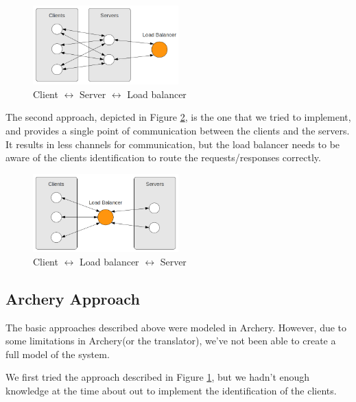 \documentclass[a4paper]{article}
\newcommand{\ar}{Archery\xspace}
\begin{document}
\begin{figure}[htb]
	\begin{center}
		\includegraphics[width=0.5\textwidth]{images/c_s_lb.png}
	\end{center}
	\caption{Client $\leftrightarrow$ Server $\leftrightarrow$ Load balancer }
	\label{fig:cslb}
\end{figure}

The second approach, depicted in Figure \ref{fig:clbs}, is the one that we
tried to implement, and provides a single point of communication between the
clients and the servers. It results in less channels for communication, but the
load balancer needs to be aware of the clients identification to route the
requests/responses correctly.

\begin{figure}[htb]
	\begin{center}
		\includegraphics[width=0.5\textwidth]{images/c_lb_s.png}
	\end{center}
	\caption{Client $\leftrightarrow$ Load balancer  $\leftrightarrow$ Server }
	\label{fig:clbs}
\end{figure}


\subsection{\ar Approach}

The basic approaches described above were modeled in \ar. However, due to some
limitations in \ar (or the translator), we've not been able to create a full
model of the system.

We first tried the approach described in Figure \ref{fig:cslb}, but we hadn't
enough knowledge at the time about out to implement the identification of the
clients.
\end{document}
